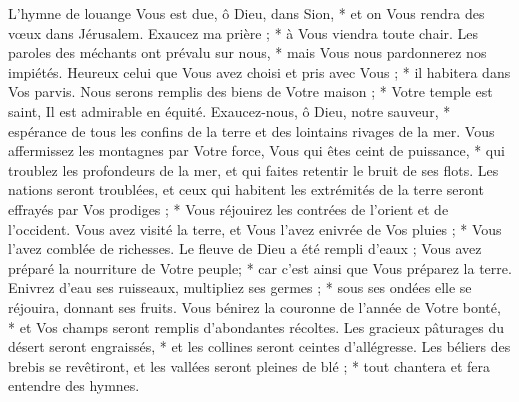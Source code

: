  L'hymne de louange Vous est due, ô Dieu, dans Sion, * et on Vous rendra des vœux dans Jérusalem.
\versseparator
 Exaucez ma prière ; * à Vous viendra toute chair.
\versseparator
 Les paroles des méchants ont prévalu sur nous, * mais Vous nous pardonnerez nos impiétés.
\versseparator
 Heureux celui que Vous avez choisi et pris avec Vous ; * il habitera dans Vos parvis.
\versseparator
 Nous serons remplis des biens de Votre maison ; * Votre temple est saint,
\versseparator
 Il est admirable en équité. Exaucez-nous, ô Dieu, notre sauveur, * espérance de tous les confins de la terre et des lointains rivages de la mer.
\versseparator
 Vous affermissez les montagnes par Votre force, Vous qui êtes ceint de puissance, * qui troublez les profondeurs de la mer, et qui faites retentir le bruit de ses flots.
\versseparator
 Les nations seront troublées, et ceux qui habitent les extrémités de la terre seront effrayés par Vos prodiges ; * Vous réjouirez les contrées de l'orient et de l'occident.
\versseparator
 Vous avez visité la terre, et Vous l'avez enivrée de Vos pluies ; * Vous l'avez comblée de richesses.
\versseparator
 Le fleuve de Dieu a été rempli d'eaux ; Vous avez préparé la nourriture de Votre peuple; * car c'est ainsi que Vous préparez la terre.
\versseparator
 Enivrez d'eau ses ruisseaux, multipliez ses germes ; * sous ses ondées elle se réjouira, donnant ses fruits.
\versseparator
 Vous bénirez la couronne de l'année de Votre bonté, * et Vos champs seront remplis d'abondantes récoltes.
\versseparator
 Les gracieux pâturages du désert seront engraissés, * et les collines seront ceintes d'allégresse.
\versseparator
 Les béliers des brebis se revêtiront, et les vallées seront pleines de blé ; * tout chantera et fera entendre des hymnes.